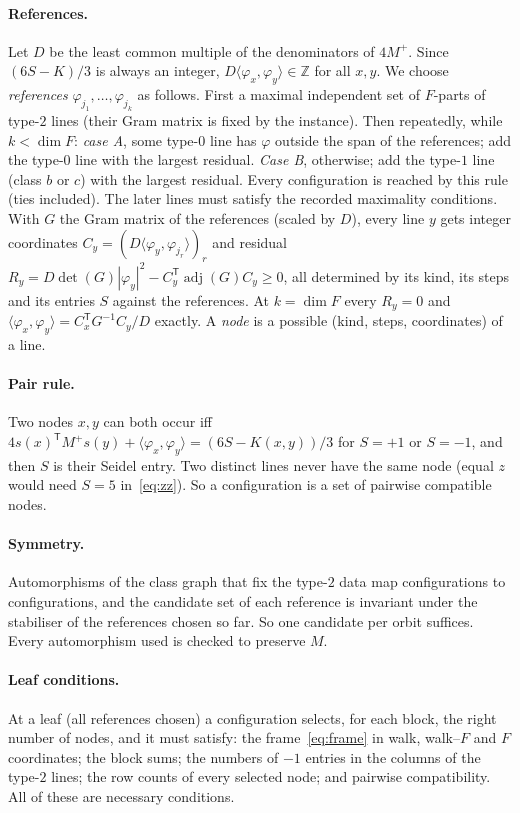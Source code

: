 \documentclass[11pt]{article}
\theoremstyle{definition}
\newcommand{\Z}{\mathbb{Z}}
\begin{document}
\paragraph{References.} Let $D$ be the least common multiple of the denominators of $4M^+$. Since
$(6S-K)/3$ is always an integer, $D\langle\varphi_x,\varphi_y\rangle\in\Z$ for all $x,y$. We choose
\emph{references} $\varphi_{j_1},\dots,\varphi_{j_k}$ as follows. First a maximal independent set of
$F$-parts of type-$2$ lines (their Gram matrix is fixed by the instance). Then repeatedly, while
$k<\dim F$: \emph{case A}, some type-$0$ line has $\varphi$ outside the span of the references; add the
type-$0$ line with the largest residual. \emph{Case B}, otherwise; add the type-$1$ line (class $b$ or
$c$) with the largest residual. Every configuration is reached by this rule (ties included). The later
lines must satisfy the recorded maximality conditions. With $G$ the Gram matrix of the references
(scaled by $D$), every line $y$ gets integer coordinates $C_y=(D\langle\varphi_y,\varphi_{j_r}\rangle)_r$ and
residual $R_y=D\det(G)|\varphi_y|^2-C_y^{\mathsf T}\operatorname{adj}(G)C_y\ge0$, all determined by its kind,
its steps and its entries $S$ against the references. At $k=\dim F$ every $R_y=0$ and
$\langle\varphi_x,\varphi_y\rangle=C_x^{\mathsf T}G^{-1}C_y/D$ exactly. A \emph{node} is a possible
(kind, steps, coordinates) of a line.

\paragraph{Pair rule.} Two nodes $x,y$ can both occur iff
$4s(x)^{\mathsf T}M^+s(y)+\langle\varphi_x,\varphi_y\rangle=(6S-K(x,y))/3$ for $S=+1$ or $S=-1$, and then
$S$ is their Seidel entry. Two distinct lines never have the same node (equal $z$ would need $S=5$
in~\eqref{eq:zz}). So a configuration is a set of pairwise compatible nodes.

\paragraph{Symmetry.} Automorphisms of the class graph that fix the type-$2$ data map configurations to
configurations, and the candidate set of each reference is invariant under the stabiliser of the
references chosen so far. So one candidate per orbit suffices. Every automorphism used is checked to
preserve $M$.

\paragraph{Leaf conditions.} At a leaf (all references chosen) a configuration selects, for each block,
the right number of nodes, and it must satisfy: the frame~\eqref{eq:frame} in walk, walk--$F$ and $F$
coordinates; the block sums; the numbers of $-1$ entries in the columns of the type-$2$ lines; the row
counts of every selected node; and pairwise compatibility. All of these are necessary conditions.
\end{document}

